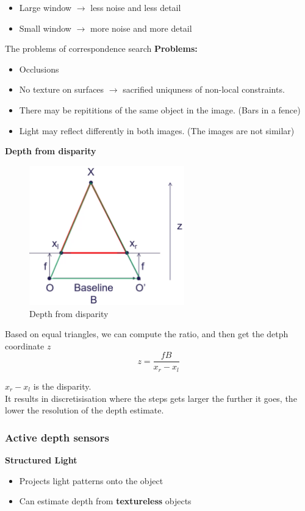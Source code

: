 \documentclass[a4paper]{article}
\begin{document}
\begin{itemize}
	\item Large window $ \rightarrow $ less noise and less detail
	\item Small window $ \rightarrow $ more noise and more detail
\end{itemize}

The problems of correspondence search
\textbf{Problems:} 
\begin{itemize}
	\item Occlusions
	\item No texture on surfaces $ \rightarrow $ sacrified uniquness of non-local constraints.
	\item There may be repititions of the same object in the image. (Bars in a fence)
	\item Light may reflect differently in both images. (The images are not similar)
\end{itemize}

\textbf{Depth from disparity} 

\begin{figure}[H]
\centering
\includegraphics[width=0.6\textwidth]{figures/Depth_from_disparity.png}
\caption{Depth from disparity}
\label{fig:detph_from_disparity}
\end{figure} 

Based on equal triangles, we can compute the ratio, and then get the detph coordinate $ z $
 \begin{equation}
z = \frac{fB}{x_r - x_l} 
\end{equation}

$ x_r - x_l $ is the disparity.\\
It results in discretisisation where the steps gets larger the further it goes, the lower the resolution of the depth estimate.

\subsubsection{Active depth sensors}
\textbf{Structured Light} 
\begin{itemize}
	\item Projects light patterns onto the object
	\item Can estimate depth from \textbf{textureless} objects
\end{itemize}
\end{document}
